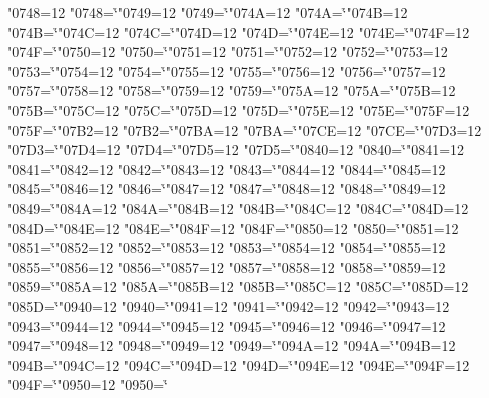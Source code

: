 \catcode"0748=12 \lccode"0748=`\h
\catcode"0749=12 \lccode"0749=`\h
\catcode"074A=12 \lccode"074A=`\h
\catcode"074B=12 \lccode"074B=`\h
\catcode"074C=12 \lccode"074C=`\h
\catcode"074D=12 \lccode"074D=`\h
\catcode"074E=12 \lccode"074E=`\h
\catcode"074F=12 \lccode"074F=`\h
\catcode"0750=12 \lccode"0750=`\h
\catcode"0751=12 \lccode"0751=`\h
\catcode"0752=12 \lccode"0752=`\h
\catcode"0753=12 \lccode"0753=`\h
\catcode"0754=12 \lccode"0754=`\h
\catcode"0755=12 \lccode"0755=`\h
\catcode"0756=12 \lccode"0756=`\h
\catcode"0757=12 \lccode"0757=`\h
\catcode"0758=12 \lccode"0758=`\h
\catcode"0759=12 \lccode"0759=`\h
\catcode"075A=12 \lccode"075A=`\h
\catcode"075B=12 \lccode"075B=`\h
\catcode"075C=12 \lccode"075C=`\h
\catcode"075D=12 \lccode"075D=`\h
\catcode"075E=12 \lccode"075E=`\h
\catcode"075F=12 \lccode"075F=`\h
\catcode"07B2=12 \lccode"07B2=`\h
\catcode"07BA=12 \lccode"07BA=`\h
\catcode"07CE=12 \lccode"07CE=`\h
\catcode"07D3=12 \lccode"07D3=`\h
\catcode"07D4=12 \lccode"07D4=`\h
\catcode"07D5=12 \lccode"07D5=`\h
\catcode"0840=12 \lccode"0840=`\h
\catcode"0841=12 \lccode"0841=`\h
\catcode"0842=12 \lccode"0842=`\h
\catcode"0843=12 \lccode"0843=`\h
\catcode"0844=12 \lccode"0844=`\h
\catcode"0845=12 \lccode"0845=`\h
\catcode"0846=12 \lccode"0846=`\h
\catcode"0847=12 \lccode"0847=`\h
\catcode"0848=12 \lccode"0848=`\h
\catcode"0849=12 \lccode"0849=`\h
\catcode"084A=12 \lccode"084A=`\h
\catcode"084B=12 \lccode"084B=`\h
\catcode"084C=12 \lccode"084C=`\h
\catcode"084D=12 \lccode"084D=`\h
\catcode"084E=12 \lccode"084E=`\h
\catcode"084F=12 \lccode"084F=`\h
\catcode"0850=12 \lccode"0850=`\h
\catcode"0851=12 \lccode"0851=`\h
\catcode"0852=12 \lccode"0852=`\h
\catcode"0853=12 \lccode"0853=`\h
\catcode"0854=12 \lccode"0854=`\h
\catcode"0855=12 \lccode"0855=`\h
\catcode"0856=12 \lccode"0856=`\h
\catcode"0857=12 \lccode"0857=`\h
\catcode"0858=12 \lccode"0858=`\h
\catcode"0859=12 \lccode"0859=`\h
\catcode"085A=12 \lccode"085A=`\h
\catcode"085B=12 \lccode"085B=`\h
\catcode"085C=12 \lccode"085C=`\h
\catcode"085D=12 \lccode"085D=`\h
\catcode"0940=12 \lccode"0940=`\h
\catcode"0941=12 \lccode"0941=`\h
\catcode"0942=12 \lccode"0942=`\h
\catcode"0943=12 \lccode"0943=`\h
\catcode"0944=12 \lccode"0944=`\h
\catcode"0945=12 \lccode"0945=`\h
\catcode"0946=12 \lccode"0946=`\h
\catcode"0947=12 \lccode"0947=`\h
\catcode"0948=12 \lccode"0948=`\h
\catcode"0949=12 \lccode"0949=`\h
\catcode"094A=12 \lccode"094A=`\h
\catcode"094B=12 \lccode"094B=`\h
\catcode"094C=12 \lccode"094C=`\h
\catcode"094D=12 \lccode"094D=`\h
\catcode"094E=12 \lccode"094E=`\h
\catcode"094F=12 \lccode"094F=`\h
\catcode"0950=12 \lccode"0950=`\h
